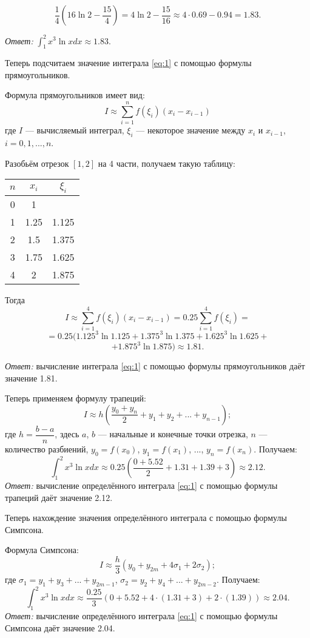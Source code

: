 \documentclass[a4paper, 12pt]{article}
\begin{document}
\begin{enumerate}
{    $$
    \dfrac {1} {4} \left ( 16 \ln 2 - \dfrac {15} {4} \right ) = 4 \ln 2 - \dfrac {15} {16} \approx 4 \cdot 0.69 - 0.94 = 1.83.
    $$

    \emph{Ответ:} $\int_1^2x^3 \ln{x} dx \approx 1.83$.

    Теперь подсчитаем значение интеграла \eqref{eq:1} с помощью формулы прямоугольников.

    Формула прямоугольников имеет вид:
    $$
    I \approx \sum_{i=1}^n f(\xi_i)(x_i - x_{i-1})
    $$
    где $I$ --- вычисляемый интеграл, $\xi_i$ --- некоторое значение между $x_i$ и $x_{i-1}$, $i=0,1,...,n$.

    Разобьём отрезок $[1,2]$ на 4 части, получаем такую таблицу:

    \begin{center}
    \begin{tabular}{|c|c|c|}
      \hline
      $n$ & $x_i$ & $\xi_i$ \\ \hline
      0 & 1 &  \\ \hline
      1 & 1.25 & 1.125 \\ \hline
      2 & 1.5 & 1.375 \\ \hline
      3 & 1.75 & 1.625 \\ \hline
      4 & 2 & 1.875 \\ \hline
    \end{tabular}
    \end{center}

    Тогда
    $$I \approx \sum_{i=1}^4 f(\xi_i)(x_i - x_{i-1}) = 0.25 \sum_{i=1}^4 f(\xi_i) =$$
    $$ = 0.25(1.125^3 \ln 1.125 + 1.375^3 \ln 1.375 + 1.625^3 \ln 1.625 +$$
    $$+1.875^3 \ln 1.875) \approx 1.81.$$

    \emph{Ответ:} вычисление интеграла \eqref{eq:1} с помощью формулы прямоугольников даёт значение 1.81.

    Теперь применяем формулу трапеций:
    $$I \approx h \left ( \dfrac {y_0 + y_n} {2} + y_1 + y_2 + ... + y_{n-1} \right );$$
    где $h = \dfrac {b -a} {n}$, здесь $a$, $b$ --- начальные и конечные точки отрезка, $n$ --- количество разбиений, $y_0 = f(x_0)$, $y_1 = f(x_1)$, ..., $y_{n} = f(x_n)$.
    Получаем:
    $$\int_1^2x^3 \ln{x} dx \approx 0.25 \left ( \dfrac {0 + 5.52} {2} + 1.31 + 1.39 + 3 \right ) \approx 2.12.$$
    \emph{Ответ:} вычисление определённого интеграла \eqref{eq:1} с помощью формулы трапеций даёт значение 2.12.

    Теперь нахождение значения определённого интеграла с помощью формулы Симпсона.

    Формула Симпсона:
    $$I \approx \dfrac {h} {3} \left ( y_0 + y_{2m} + 4 \sigma_1 + 2 \sigma_2 \right );$$
    где $\sigma_1 = y_1 + y_3 + ... + y_{2m-1}$, $\sigma_2 = y_2 + y_4 + ... + y_{2m-2}$.
    Получаем:
    $$\int_1^2x^3 \ln{x} dx \approx \dfrac {0.25} {3} \left ( 0 + 5.52 + 4 \cdot (1.31 + 3) + 2 \cdot (1.39) \right ) \approx 2.04.$$
    \emph{Ответ:} вычисление определённого интеграла \eqref{eq:1} с помощью формулы Симпсона даёт значение 2.04.

  }
\end{enumerate}
\end{document}

